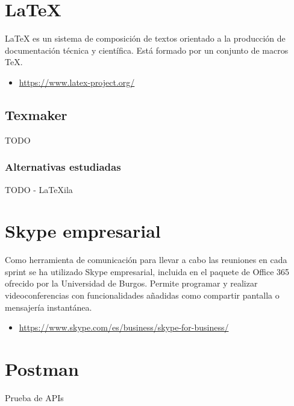 \section{LaTeX}

LaTeX es un sistema de composición de textos orientado a la producción de documentación técnica y científica. Está formado por un conjunto de macros TeX.

\begin{itemize}
	\item \url{https://www.latex-project.org/}
\end{itemize}

\subsection{Texmaker}

TODO

\subsubsection{Alternativas estudiadas}

TODO - LaTeXila

\section{Skype empresarial}

Como herramienta de comunicación para llevar a cabo las reuniones en cada sprint se ha utilizado Skype empresarial, incluida en el paquete de Office 365 ofrecido por la Universidad de Burgos. Permite programar y realizar videoconferencias con funcionalidades añadidas como compartir pantalla o mensajería instantánea.

\begin{itemize}
	\item \url{https://www.skype.com/es/business/skype-for-business/}
\end{itemize}

\section{Postman}

Prueba de APIs